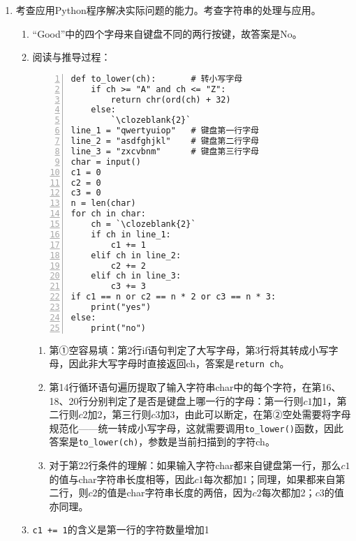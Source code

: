 \begin{enumerate}
\item 考查应用Python程序解决实际问题的能力。考查字符串的处理与应用。
	\begin{enumerate}[label=$(\arabic*)$]
	\item “Good”中的四个字母来自键盘不同的两行按键，故答案是No。
	\item 阅读与推导过程：
\setcounter{qnumber}{1}
\begin{lstlisting}[numbers=left]
def to_lower(ch):       # 转小写字母
    if ch >= "A" and ch <= "Z":
        return chr(ord(ch) + 32)
    else:
        `\clozeblank{2}`
line_1 = "qwertyuiop"   # 键盘第一行字母
line_2 = "asdfghjkl"    # 键盘第二行字母
line_3 = "zxcvbnm"      # 键盘第三行字母
char = input()
c1 = 0
c2 = 0
c3 = 0
n = len(char)
for ch in char:
    ch = `\clozeblank{2}`
    if ch in line_1:
        c1 += 1
    elif ch in line_2:
        c2 += 2
    elif ch in line_3:
        c3 += 3
if c1 == n or c2 == n * 2 or c3 == n * 3:
    print("yes")
else:
    print("no")
\end{lstlisting}
	\begin{enumerate}[label=$(\alph*)$]
	\item 第①空容易填：第2行if语句判定了大写字母，第3行将其转成小写字母，因此非大写字母时直接返回ch，答案是\lstinline|return ch|。
	\item 第14行循环语句遍历提取了输入字符串char中的每个字符，在第16、18、20行分别判定了是否是键盘上哪一行的字母：第一行则$c1$加1，第二行则$c2$加2，第三行则$c3$加3，由此可以断定，在第②空处需要将字母规范化——统一转成小写字母，这就需要调用\lstinline|to_lower()|函数，因此答案是\lstinline|to_lower(ch)|，参数是当前扫描到的字符ch。
	\item 对于第22行条件的理解：如果输入字符char都来自键盘第一行，那么$c1$的值与char字符串长度相等，因此$c1$每次都加1；同理，如果都来自第二行，则$c2$的值是char字符串长度的两倍，因为$c2$每次都加2；$c3$的值亦同理。
	\end{enumerate}
	\item \lstinline|c1 += 1|的含义是第一行的字符数量增加1
	\end{enumerate}


\end{enumerate}
